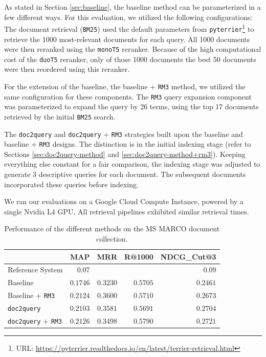 \documentclass[sigconf]{acmart}
\begin{document}
As stated in Section \ref{sec:baseline}, the baseline method can be parameterized in a few different ways. For this evaluation, we utilized the following configurations: The document retrieval (\texttt{BM25}) used the default parameters from \texttt{pyterrier}\footnote{URL: \url{https://pyterrier.readthedocs.io/en/latest/terrier-retrieval.html}} to retrieve the 1000 most-relevant documents for each query. All 1000 documents were then reranked using the \texttt{monoT5} reranker. Because of the high computational cost of the \texttt{duoT5} reranker, only of those 1000 documents the best 50 documents were then reordered using this reranker.

For the extension of the baseline, the baseline + \texttt{RM3} method, we utilized the same configuration for these components. The \texttt{RM3} query expansion component was parameterized to expand the query by 26 terms, using the top 17 documents retrieved by the initial \texttt{BM25} search.

The \texttt{doc2query} and \texttt{doc2query} + \texttt{RM3} strategies built upon the baseline and baseline + \texttt{RM3} designs. The distinction is in the initial indexing stage (refer to Sections \ref{sec:doc2query-method} and \ref{sec:doc2query-method+rm3}). Keeping everything else constant for a fair comparison, the indexing stage was adjusted to generate 3 descriptive queries for each document. The subsequent documents incorporated these queries before indexing.

We ran our evaluations on a Google Cloud Compute Instance, powered by a single Nvidia L4 GPU. All retrieval pipelines exhibited similar retrieval times.

\begin{table}[h]
\begin{center}
	\caption{Performance of the different methods on the MS MARCO document collection.}
	\begin{tabular}{l|rrrr}
			& MAP & MRR & R@1000 & NDCG\_Cut@3 \\
		\hline
		Reference System & 0.07 &  &  & 0.09 \\
		Baseline & $0.1746$ & $0.3230$ & $0.5705$ & $0.2461$ \\
		Baseline + \texttt{RM3} & $0.2124$ & $\mathbf{0.3600}$ & $0.5710$ & $0.2673$ \\
		\texttt{doc2query} & $0.2103$ & $0.3581$ & $0.5691$ & $0.2704$ \\
		\texttt{doc2query} + \texttt{RM3} & $\mathbf{0.2126}$ & 0.3498 & $\mathbf{0.5790}$ & $\mathbf{0.2721}$
	\end{tabular}
	\label{table:1}
\end{center}
\end{table}
\end{document}
